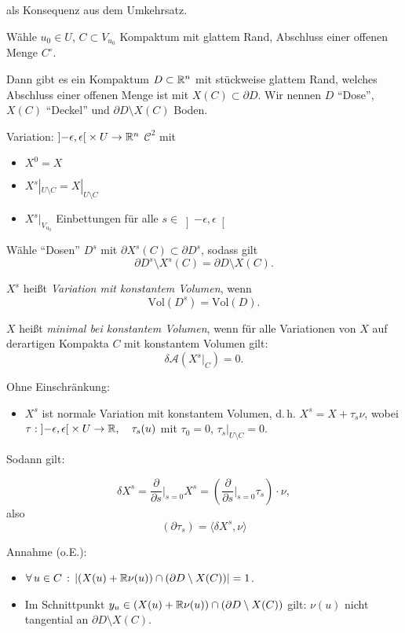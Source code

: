 \documentclass{cheat-sheet}
\begin{document}
als Konsequenz aus dem Umkehrsatz.

Wähle $u_0 \in U$, $C \subset V_{u_0}$ Kompaktum mit glattem Rand, Abschluss einer offenen Menge $C^\circ$.

Dann gibt es ein Kompaktum $D \subset \mathbb{R}^n$ mit stückweise glattem Rand, welches Abschluss einer offenen Menge ist mit $X(C) \subset \partial D$. Wir nennen $D$ "`Dose"', $X(C)$ "`Deckel"' und $\partial D \setminus X(C)$ Boden.

Variation: $\left] -\epsilon, \epsilon \right[ \times U \to \mathbb{R}^n$ $\mathcal{C}^2$ mit

\begin{itemize}
  \item $X^0 = X$
  \item $X^s|_{U \setminus C} = X|_{U \setminus C}$
  \item $X^s|_{V_{u_0}}$ Einbettungen für alle $s \in \left] -\epsilon, \epsilon \right[$
\end{itemize}

Wähle "`Dosen"' $D^s$ mit $\partial X^s(C) \subset \partial D^s$, sodass gilt
\[ \partial D^s \setminus X^s(C) = \partial D \setminus X(C). \]

$X^s$ heißt \emph{Variation mit konstantem Volumen}, wenn
\[ \mathrm{Vol}(D^s) = \mathrm{Vol}(D). \]

\begin{definition}
  $X$ heißt \emph{minimal bei konstantem Volumen}, wenn für alle Variationen von $X$ auf derartigen Kompakta $C$ mit konstantem Volumen gilt:
  \[ \delta \mathcal{A} (X^s|_C) = 0. \]
\end{definition}

Ohne Einschränkung:
\begin{itemize}
  \item $X^s$ ist normale Variation mit konstantem Volumen, %
  d.\,h. $X^s = X + \tau_s \nu$, wobei $\tau : \left] -\epsilon, \epsilon \right[ \times U \to \mathbb{R}, \quad \tau_s(u)$ mit $\tau_0 = 0$, $\tau_s|_{U \setminus C} = 0$.
\end{itemize}

Sodann gilt:

\[ \delta X^s = \frac{\partial}{\partial s}|_{s=0} X^s = (\frac{\partial}{\partial s}|_{s=0} \tau_s) \cdot \nu, \]
also
\[ (\partial \tau_s) = \langle \delta X^s, \nu \rangle \] %

Annahme (o.E.):
\begin{itemize}
  \item $\forall \, {u \in C} \,:\, \lvert(X(u) + \mathbb{R} \nu(u)) \cap (\partial D \setminus X(C))\rvert = 1$.
  \item Im Schnittpunkt $y_u \in (X(u) + \mathbb{R} \nu(u)) \cap (\partial D \setminus X(C))$ gilt: $\nu(u)$ nicht tangential an $\partial D \setminus X(C)$.
\end{itemize}
\end{document}
